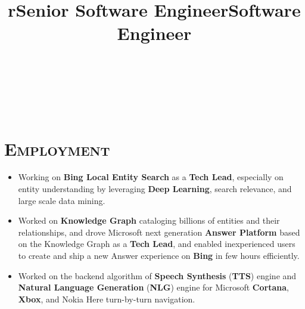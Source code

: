 \begin{resume}

\begin{formatb}
  \title{r}\\
  \\
  \body\\
\end{formatb}

\vspace*{-8pt}
\section{\textsc{Employment}}

\title{Senior Software Engineer}
\begin{position}
\vspace*{-8pt}
\begin{itemize}
\item Working on \textbf{Bing Local Entity Search} as a \textbf{Tech Lead}, especially on entity understanding by leveraging \textbf{Deep Learning}, search relevance, and large scale data mining.
\end{itemize} 
\end{position}

\title{Software Engineer}
\begin{position}
\vspace*{-8pt}
\begin{itemize}
\item Worked on \textbf{Knowledge Graph} cataloging billions of entities and their relationships, and drove Microsoft next generation \textbf{Answer Platform} based on the Knowledge Graph as a \textbf{Tech Lead}, and enabled inexperienced users to create and ship a new Answer experience on \textbf{Bing} in few hours efficiently.
\vspace*{-12pt}
\newline
\item Worked on the backend algorithm of \textbf{Speech Synthesis} (\textbf{TTS}) engine and \textbf{Natural Language Generation} (\textbf{NLG}) engine for Microsoft \textbf{Cortana}, \textbf{Xbox}, and Nokia Here turn-by-turn navigation.
\end{itemize} 
\end{position}


\end{resume}
